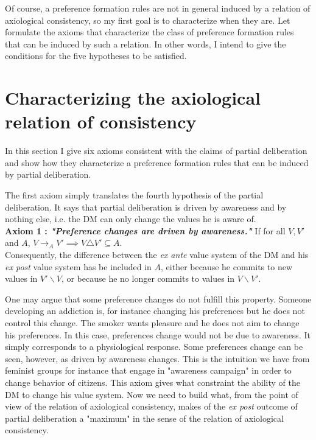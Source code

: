 \documentclass[11pt]{article}
\begin{document}
Of course, a preference formation rules are not in general induced by a relation of axiological consistency, so my first goal is to characterize when they are. Let formulate the axioms that characterize the class of preference formation rules that can be induced by such a relation. In other words, I intend to give the conditions for the five hypotheses to be satisfied.



\section{Characterizing the axiological relation of consistency}
In this section I give six axioms consistent with the claims of partial deliberation and show how they characterize a preference formation rules that can be induced by partial deliberation.  

The first axiom simply translates the fourth hypothesis of the partial deliberation. It says that partial deliberation is driven by awareness and by nothing else, i.e. the DM can only change the values he is aware of. 
 \\
 
 \noindent
\textbf{Axiom 1 : \textit{"Preference changes are driven by awareness."}} If for all $V,V'$ and $A$, $V\rightarrow_{A} V' \implies V\triangle V'\subseteq A$.
\\

 Consequently, the difference between the \textit{ex ante} value system of the DM and his \textit{ex post} value system has be included in $A$, either because he commits to new values in $V'\backslash V$, or because he no longer commits to values in $V\backslash V'$.

One may argue that some preference changes do not fulfill this property. Someone developing an addiction is, for instance changing his preferences but he does not control this change. The smoker wants pleasure and he does not aim to change his preferences. In this case, preferences change would not be due to awareness. It simply corresponds to a physiological response. Some preferences change can be seen, however, as driven by awareness changes. This is the intuition we have from feminist groups for instance that engage in "awareness campaign" in order to change behavior of citizens. This axiom gives what constraint the ability of the DM to change his value system. Now we need to build what, from the point of view of the relation of axiological consistency, makes of the \textit{ex post} outcome of partial deliberation a "maximum" in the sense of the relation of axiological consistency. 
\end{document}
